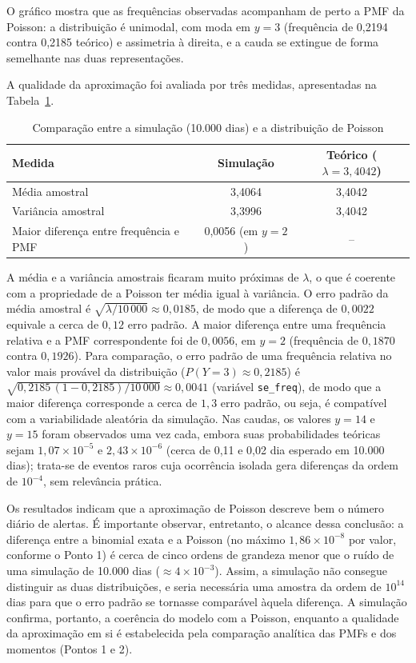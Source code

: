 \documentclass[10pt,a4paper]{article}
\begin{document}
O gráfico mostra que as frequências observadas acompanham de perto a PMF da Poisson: a distribuição é unimodal, com moda em $y = 3$ (frequência de 0,2194 contra 0,2185 teórico) e assimetria 
à direita, e a cauda se extingue de forma semelhante nas duas representações.

A qualidade da aproximação foi avaliada por três medidas, apresentadas na Tabela~\ref{tab:q2-qualidade}.

\begin{table}[H]
\centering
\caption{Comparação entre a simulação (10.000 dias) e a distribuição de Poisson}
\label{tab:q2-qualidade}
\begin{tabular}{lcc}
\hline
\textbf{Medida} & \textbf{Simulação} & \textbf{Teórico ($\lambda = 3{,}4042$)} \\
\hline
Média amostral         & 3,4064 & 3,4042 \\
Variância amostral     & 3,3996 & 3,4042 \\
Maior diferença entre frequência e PMF & 0,0056 (em $y = 2$) & -- \\
\hline
\end{tabular}
\end{table}

A média e a variância amostrais ficaram muito próximas de $\lambda$, o que é coerente com a propriedade de a Poisson ter média igual à variância. O erro padrão da média amostral é 
$\sqrt{\lambda/10\,000} \approx 0{,}0185$, de modo que a diferença de $0{,}0022$ equivale a cerca de $0{,}12$ erro padrão. A maior diferença entre uma frequência relativa e a PMF 
correspondente foi de $0{,}0056$, em $y = 2$ (frequência de $0{,}1870$ contra $0{,}1926$). Para comparação, o erro padrão de uma frequência relativa no valor mais provável da distribuição 
($P(Y = 3) \approx 0{,}2185$) é $\sqrt{0{,}2185\,(1 - 0{,}2185)/10\,000} \approx 0{,}0041$ (variável \texttt{se\_freq}), de modo que a maior diferença corresponde a cerca de $1{,}3$ erro 
padrão, ou seja, é compatível com a variabilidade aleatória da simulação. Nas caudas, os valores $y = 14$ e $y = 15$ foram observados uma vez cada, embora suas probabilidades teóricas 
sejam $1{,}07 \times 10^{-5}$ e $2{,}43 \times 10^{-6}$ (cerca de 0,11 e 0,02 dia esperado em 10.000 dias); trata-se de eventos raros cuja ocorrência isolada gera diferenças da ordem de 
$10^{-4}$, sem relevância prática.

Os resultados indicam que a aproximação de Poisson descreve bem o número diário de alertas. É importante observar, entretanto, o alcance dessa conclusão: a diferença entre a binomial 
exata e a Poisson (no máximo $1{,}86 \times 10^{-8}$ por valor, conforme o Ponto 1) é cerca de cinco ordens de grandeza menor que o ruído de uma simulação de 10.000 dias 
($\approx 4 \times 10^{-3}$). Assim, a simulação não consegue distinguir as duas distribuições, e seria necessária uma amostra da ordem de $10^{14}$ dias para que o erro padrão se tornasse 
comparável àquela diferença. A simulação confirma, portanto, a coerência do modelo com a Poisson, enquanto a qualidade da aproximação em si é estabelecida pela comparação analítica das PMFs 
e dos momentos (Pontos 1 e 2).
\clearpage
\end{document}
